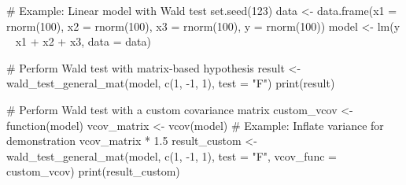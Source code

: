\documentclass[a4paper]{book}
\begin{document}
\begin{Examples}
\begin{ExampleCode}
# Example: Linear model with Wald test
set.seed(123)
data <- data.frame(x1 = rnorm(100), x2 = rnorm(100), x3 = rnorm(100), y = rnorm(100))
model <- lm(y ~ x1 + x2 + x3, data = data)

# Perform Wald test with matrix-based hypothesis
result <- wald_test_general_mat(model, c(1, -1, 1), test = "F")
print(result)

# Perform Wald test with a custom covariance matrix
custom_vcov <- function(model) {
  vcov_matrix <- vcov(model)
  # Example: Inflate variance for demonstration
  vcov_matrix * 1.5
}
result_custom <- wald_test_general_mat(model, c(1, -1, 1), test = "F", vcov_func = custom_vcov)
print(result_custom)

\end{ExampleCode}
\end{Examples}
\end{document}
